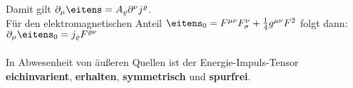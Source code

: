 Damit gilt $\partial_{\mu}\eitens = A_{\varrho}\partial^{\nu}j^{\varrho}$. \\
Für den elektromagnetischen Anteil $\eitens_0 = \fu F_{\sigma}^{\nu} + \frac{1}{4}g^{\mu\nu}F^2$ folgt dann: 
$\partial_{\mu}\eitens_0=j_{\varrho}F^{\varrho\nu}$ \\
\vspace{1pt} \\
In Abwesenheit von äußeren Quellen ist der Energie-Impuls-Tensor \textbf{eichinvarient}, \textbf{erhalten}, \textbf{symmetrisch} und \textbf{spurfrei}.